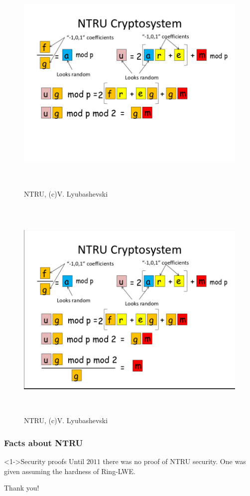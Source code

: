 \documentclass{beamer}
\begin{document}
\begin{frame}
    \begin{figure}
            \includegraphics[width=12cm,height=11cm,keepaspectratio]{img/vadim4.png}
            \caption{NTRU, (c)V. Lyubashevski}
        \end{figure}
\end{frame}

\begin{frame}
    \begin{figure}
            \includegraphics[width=12cm,height=11cm,keepaspectratio]{img/vadim5.png}
            \caption{NTRU, (c)V. Lyubashevski}
        \end{figure}
\end{frame}

\begin{frame}
    \frametitle{Facts about NTRU}
    \begin{block}<1->{Security proofs}
        Until $2011$ there was no proof of NTRU security. One was given assuming the hardness of Ring-LWE.
    \end{block}
\end{frame}
\begin{frame}
\Huge{\centerline{Thank you!}}
\end{frame}
\end{document}
